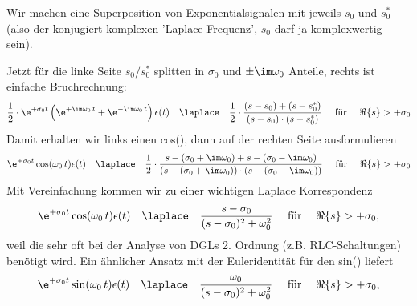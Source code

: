 \begin{ExCalc}
Wir machen eine Superposition von Exponentialsignalen mit jeweils $s_0$ und
$s_0^*$ (also der konjugiert komplexen 'Laplace-Frequenz',
$s_0$ darf ja komplexwertig sein).

Jetzt für die linke Seite $s_0/s_0^*$ splitten in $\sigma_0$ und $\pm\im\omega_0$
Anteile, rechts ist einfache Bruchrechnung:
\begin{align}
\frac{1}{2}\cdot\e^{+\sigma_0 t}
\left(
\e^{+\im\omega_0 \, t}+
\e^{-\im\omega_0 \, t}
\right) \epsilon(t)
\quad \laplace \quad
\frac{1}{2}\cdot\frac{(s-s_0) + (s-s_0^*)}{(s-s_0)\cdot(s-s_0^*)}
\quad\text{ für } \quad\Re\{s\} > +\sigma_0
\end{align}
Damit erhalten wir links einen cos(), dann auf der rechten Seite ausformulieren
\begin{align}
\e^{+\sigma_0 t} \cos(\omega_0 \, t) \epsilon(t)
\quad \laplace \quad
\frac{1}{2}\cdot\frac{s-(\sigma_0+\im\omega_0) + s-(\sigma_0-\im\omega_0)}
{(s-(\sigma_0+\im\omega_0)) \cdot (s-(\sigma_0-\im\omega_0))}
\quad\text{ für } \quad\Re\{s\} > +\sigma_0
\end{align}
Mit Vereinfachung kommen wir zu einer wichtigen Laplace Korrespondenz
\begin{align}
\e^{+\sigma_0 t} \cos(\omega_0 \, t) \epsilon(t)
\quad \laplace \quad
\frac{s-\sigma_0}{(s-\sigma_0)^2+\omega_0^2}
\quad\text{ für } \quad\Re\{s\} >  +\sigma_0,
\end{align}
weil die sehr oft bei der Analyse von DGLs 2. Ordnung (z.B. RLC-Schaltungen)
benötigt wird.
%
Ein ähnlicher Ansatz mit der Euleridentität für den sin() liefert
\begin{align}
\e^{+\sigma_0 t} \sin(\omega_0 \, t) \epsilon(t)
\quad \laplace \quad
\frac{\omega_0}{(s-\sigma_0)^2+\omega_0^2}
\quad\text{ für } \quad\Re\{s\} >  +\sigma_0,
\end{align}

\end{ExCalc}
